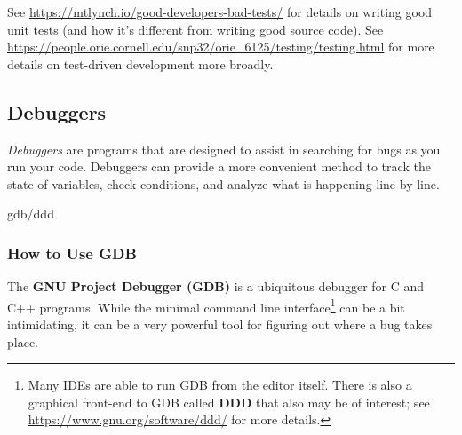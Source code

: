 \documentclass[12pt]{article}
\begin{document}
See \url{https://mtlynch.io/good-developers-bad-tests/} for details on writing good unit tests (and how it's different from writing good source code). See \url{https://people.orie.cornell.edu/snp32/orie_6125/testing/testing.html} for more details on test-driven development more broadly.



\subsection{Debuggers} \label{sec:debuggers}
\emph{Debuggers} are programs that are designed to assist in searching for bugs as you run your code. Debuggers can provide a more convenient method to track the state of variables, check conditions, and analyze what is happening line by line.

gdb/ddd
\subsubsection{How to Use GDB}
The \textbf{GNU Project Debugger (GDB)} is a ubiquitous debugger for C and C++ programs. While the minimal command line interface\footnote{Many IDEs are able to run GDB from the editor itself. There is also a graphical front-end to GDB called \textbf{DDD} that also may be of interest; see \url{https://www.gnu.org/software/ddd/} for more details.} can be a bit intimidating, it can be a very powerful tool for figuring out where a bug takes place.
\end{document}
